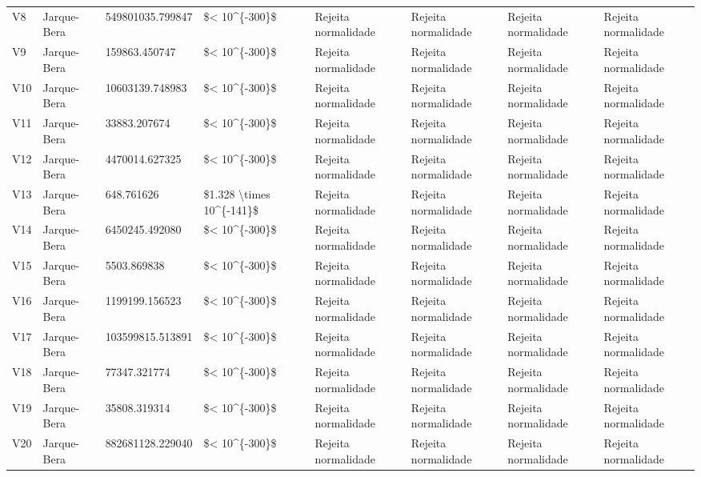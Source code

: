 \begin{longtable}{llllllll}
V8 & Jarque-Bera & 549801035.799847 & \$< 10\textasciicircum \{-300\}\$ & Rejeita normalidade & Rejeita normalidade & Rejeita normalidade & Rejeita normalidade \\
V9 & Jarque-Bera & 159863.450747 & \$< 10\textasciicircum \{-300\}\$ & Rejeita normalidade & Rejeita normalidade & Rejeita normalidade & Rejeita normalidade \\
V10 & Jarque-Bera & 10603139.748983 & \$< 10\textasciicircum \{-300\}\$ & Rejeita normalidade & Rejeita normalidade & Rejeita normalidade & Rejeita normalidade \\
V11 & Jarque-Bera & 33883.207674 & \$< 10\textasciicircum \{-300\}\$ & Rejeita normalidade & Rejeita normalidade & Rejeita normalidade & Rejeita normalidade \\
V12 & Jarque-Bera & 4470014.627325 & \$< 10\textasciicircum \{-300\}\$ & Rejeita normalidade & Rejeita normalidade & Rejeita normalidade & Rejeita normalidade \\
V13 & Jarque-Bera & 648.761626 & \$1.328 \textbackslash times 10\textasciicircum \{-141\}\$ & Rejeita normalidade & Rejeita normalidade & Rejeita normalidade & Rejeita normalidade \\
V14 & Jarque-Bera & 6450245.492080 & \$< 10\textasciicircum \{-300\}\$ & Rejeita normalidade & Rejeita normalidade & Rejeita normalidade & Rejeita normalidade \\
V15 & Jarque-Bera & 5503.869838 & \$< 10\textasciicircum \{-300\}\$ & Rejeita normalidade & Rejeita normalidade & Rejeita normalidade & Rejeita normalidade \\
V16 & Jarque-Bera & 1199199.156523 & \$< 10\textasciicircum \{-300\}\$ & Rejeita normalidade & Rejeita normalidade & Rejeita normalidade & Rejeita normalidade \\
V17 & Jarque-Bera & 103599815.513891 & \$< 10\textasciicircum \{-300\}\$ & Rejeita normalidade & Rejeita normalidade & Rejeita normalidade & Rejeita normalidade \\
V18 & Jarque-Bera & 77347.321774 & \$< 10\textasciicircum \{-300\}\$ & Rejeita normalidade & Rejeita normalidade & Rejeita normalidade & Rejeita normalidade \\
V19 & Jarque-Bera & 35808.319314 & \$< 10\textasciicircum \{-300\}\$ & Rejeita normalidade & Rejeita normalidade & Rejeita normalidade & Rejeita normalidade \\
V20 & Jarque-Bera & 882681128.229040 & \$< 10\textasciicircum \{-300\}\$ & Rejeita normalidade & Rejeita normalidade & Rejeita normalidade & Rejeita normalidade \\

\end{longtable}
